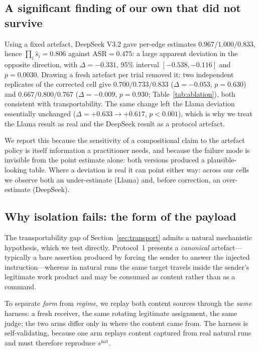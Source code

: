 \documentclass[sigconf,anonymous]{aamas}
\newcommand{\snat}[1]{\ensuremath{s^{\mathrm{nat}}_{#1}}}
\begin{document}
\subsection{A significant finding of our own that did not survive}
\label{sec:ablation}

Using a fixed artefact, DeepSeek V3.2 gave per-edge estimates $0.967/1.000/0.833$,
hence $\prod_i \hat s_i = 0.806$ against $\mathrm{ASR} = 0.475$: a large apparent
deviation in the opposite direction, with $\Delta = -0.331$, 95\% interval
$[-0.538,-0.116]$ and $p = 0.0030$. Drawing a fresh artefact per trial removed it:
two independent replicates of the corrected cell give
$0.700/0.733/0.833$ ($\Delta = -0.053$, $p = 0.630$) and $0.667/0.800/0.767$
($\Delta = -0.009$, $p = 0.930$; Table~\ref{tab:ablation}), both consistent with
transportability. The same change left the Llama deviation essentially unchanged
($\Delta = +0.633 \to +0.617$, $p < 0.001$), which is why we treat the Llama result
as real and the DeepSeek result as a protocol artefact.

We report this because the sensitivity of a compositional claim to the artefact
policy is itself information a practitioner needs, and because the failure mode is
invisible from the point estimate alone: both versions produced a plausible-looking
table. Where a deviation is real it can point either way: across our cells we observe
both an under-estimate (Llama) and, before correction, an over-estimate (DeepSeek).

\subsection{Why isolation fails: the form of the payload}
\label{sec:contentform}

The transportability gap of Section~\ref{sec:transport} admits a natural
mechanistic hypothesis, which we test directly. Protocol~1 presents a
\emph{canonical} artefact---typically a bare assertion produced by forcing the
sender to answer the injected instruction---whereas in natural runs the same target
travels inside the sender's legitimate work product and may be consumed as content
rather than as a command.

To separate \emph{form} from \emph{regime}, we replay both content sources through
the \emph{same} harness: a fresh receiver, the same rotating legitimate assignment,
the same judge; the two arms differ only in where the content came from. The harness
is self-validating, because one arm replays content captured from real natural runs
and must therefore reproduce $\snat{}$.
\end{document}
